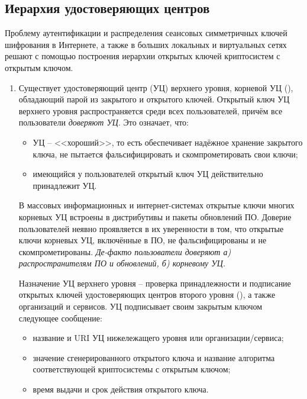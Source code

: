 \subsection{Иерархия удостоверяющих центров}\label{section-CAs}

Проблему аутентификации и распределения сеансовых симметричных ключей шифрования в Интернете, а также в больших локальных и виртуальных сетях решают с помощью построения иерархии открытых ключей криптосистем с открытым ключом.

\begin{enumerate}
    \item Существует удостоверяющий центр (УЦ) верхнего уровня, корневой УЦ (), обладающий парой из закрытого и открытого ключей. Открытый ключ УЦ верхнего уровня распространяется среди всех пользователей, причём все пользователи \emph{доверяют УЦ}. Это означает, что:
        \begin{itemize}
            \item УЦ -- <<хороший>>, то есть обеспечивает надёжное хранение закрытого ключа, не пытается фальсифицировать и скомпрометировать свои ключи;
            \item имеющийся у пользователей открытый ключ УЦ действительно принадлежит УЦ.
        \end{itemize}
        В массовых информационных и интернет-системах открытые ключи многих корневых УЦ встроены в дистрибутивы и пакеты обновлений ПО. Доверие пользователей неявно проявляется в их уверенности в том, что открытые ключи корневых УЦ, включённые в ПО, не фальсифицированы и не скомпрометированы. \emph{Де-факто пользователи доверяют а) распространителям ПО и обновлений, б) корневому УЦ.}

        Назначение УЦ верхнего уровня -- проверка принадлежности и подписание открытых ключей удостоверяющих центров второго уровня (), а также организаций и сервисов. УЦ подписывает своим закрытым ключом следующее сообщение:
        \begin{itemize}
            \item название и URI УЦ нижележащего уровня или организации/сервиса;
            \item значение сгенерированного открытого ключа и название алгоритма соответствующей криптосистемы с открытым ключом;
            \item время выдачи и срок действия открытого ключа.
        \end{itemize}


\end{enumerate}
